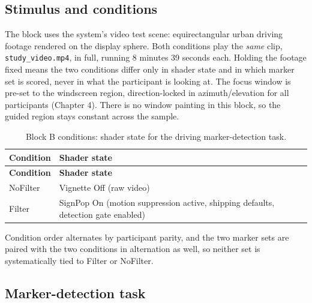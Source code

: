 \subsection{Stimulus and conditions}

The block uses the system's video test scene: equirectangular urban driving footage rendered on the
display sphere. Both conditions play the \textit{same} clip, \verb|study_video.mp4|, in full, running
8 minutes 39 seconds each. Holding the footage fixed means the two conditions differ only in shader
state and in which marker set is scored, never in what the participant is looking at. The focus
window is pre-set to the windscreen region, direction-locked in azimuth/elevation for all
participants (Chapter 4). There is no window painting in this block, so the guided region stays
constant across the sample.

\begin{longtable}{p{}|p{}}
\caption{Block B conditions: shader state for the driving marker-detection task.}\\
\hline
\textbf{Condition} & \textbf{Shader state} \\
\hline
\endfirsthead
\hline
\textbf{Condition} & \textbf{Shader state} \\
\hline
\endhead
\hline
NoFilter & Vignette Off (raw video) \\
Filter & SignPop On (motion suppression active, shipping defaults, detection gate enabled) \\
\hline
\end{longtable}

Condition order alternates by participant parity, and the two marker sets are paired with the two
conditions in alternation as well, so neither set is systematically tied to Filter or NoFilter.

\subsection{Marker-detection task}

